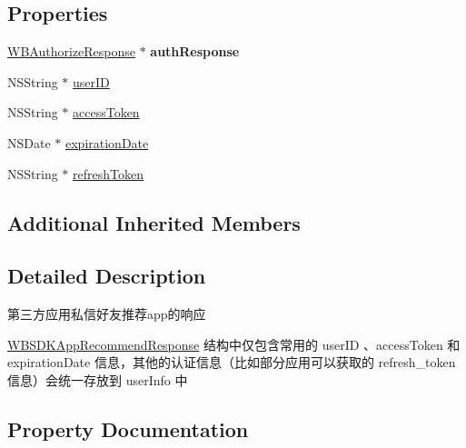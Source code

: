\subsection*{Properties}
\begin{DoxyCompactItemize}
\item 
\mbox{\label{interface_w_b_s_d_k_app_recommend_response_a1360bf8efd7b5af2050a1c03a12af72d}} 
\mbox{\hyperlink{interface_w_b_authorize_response}{W\+B\+Authorize\+Response}} $\ast$ {\bfseries auth\+Response}
\item 
N\+S\+String $\ast$ \mbox{\hyperlink{interface_w_b_s_d_k_app_recommend_response_a3d45cebd15f2d640e7808d61509d90ed}{user\+ID}}
\item 
N\+S\+String $\ast$ \mbox{\hyperlink{interface_w_b_s_d_k_app_recommend_response_ab50cf37d24bfaea16140ce13be0298a8}{access\+Token}}
\item 
N\+S\+Date $\ast$ \mbox{\hyperlink{interface_w_b_s_d_k_app_recommend_response_a10370925e55a854349b636c4ef3507a5}{expiration\+Date}}
\item 
N\+S\+String $\ast$ \mbox{\hyperlink{interface_w_b_s_d_k_app_recommend_response_a5d040c11597dfa4448e61255939de3c3}{refresh\+Token}}
\end{DoxyCompactItemize}
\subsection*{Additional Inherited Members}


\subsection{Detailed Description}
第三方应用私信好友推荐app的响应

\mbox{\hyperlink{interface_w_b_s_d_k_app_recommend_response}{W\+B\+S\+D\+K\+App\+Recommend\+Response}} 结构中仅包含常用的 user\+ID 、access\+Token 和 expiration\+Date 信息，其他的认证信息（比如部分应用可以获取的 refresh\+\_\+token 信息）会统一存放到 user\+Info 中 

\subsection{Property Documentation}
\mbox{\label{interface_w_b_s_d_k_app_recommend_response_ab50cf37d24bfaea16140ce13be0298a8}} 
